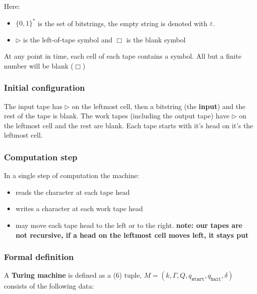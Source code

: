 \documentclass{article}
\begin{document}
Here:

\begin{itemize}
  \item $\{ 0,1 \}^{*} $ is the set of bitstrings, the empty string is denoted with $\varepsilon$.
  \item $\rhd$ is the left-of-tape symbol and $\Box$ is the blank symbol
\end{itemize}

At any point in time, each cell of each tape contains a symbol. All but a finite number will be blank ($\Box$)

\subsubsection{Initial configuration}

The input tape has $\rhd$ on the leftmost cell, then a bitstring (the \textbf{input}) and the rest of the tape is blank. The work tapes (including the output tape) have $\rhd$ on the leftmost cell and the rest are blank.
Each tape starts with it's head on it's the leftmost cell.

\subsubsection{Computation step}

In a single step of computation the machine:

\begin{itemize}
  \item reads the character at each tape head
  \item writes a character at each work tape head
  \item may move each tape head to the left or to the right. \textbf{note: our tapes are not recursive, if a head on the leftmost cell moves left, it stays put}
\end{itemize}

\subsubsection{Formal definition}

A \textbf{Turing machine} is defined as a (6) tuple, $M = (k, \Gamma, Q, q_{\texttt{start}}, q_{\texttt{halt} },\delta )$ consists of the following data:
\end{document}
